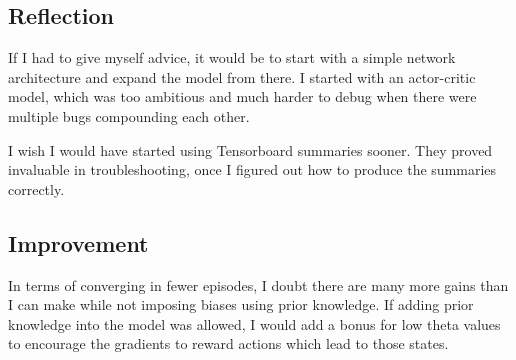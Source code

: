 \documentclass[12pt,a4paper]{article}
\begin{document}
\subsection*{Reflection}
If I had to give myself advice, it would be to start with a simple network architecture and expand the model from there. I started with an actor-critic model, which was too ambitious and much harder to debug when there were multiple bugs compounding each other.

I wish I would have started using Tensorboard summaries sooner. They proved invaluable in troubleshooting, once I figured out how to produce the summaries correctly.

\subsection*{Improvement}

In terms of converging in fewer episodes, I doubt there are many more gains than I can make while not imposing biases using prior knowledge. If adding prior knowledge into the model was allowed, I would add a bonus for low theta values to encourage the gradients to reward actions which lead to those states.
\end{document}
